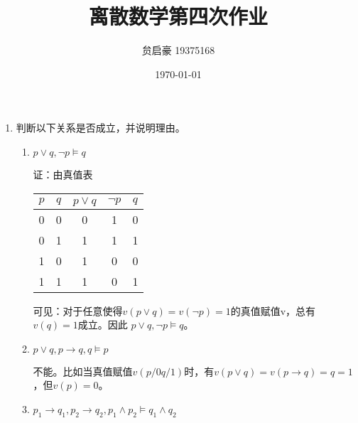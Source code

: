 \documentclass[UTF8]{ctexart}
\title{离散数学第四次作业}
\author{贠启豪 19375168}
\date{\today}
\begin{document}
   \maketitle
    \begin{enumerate}
        \item 判断以下关系是否成立，并说明理由。
        \begin{enumerate}
            \item $p \vee  q , \neg p \models  q $
            
            证：由真值表
            \begin{table}[H]
                \centering
                \begin{tabular}{|ccccc|}
                    \hline
                    $p$ & $q$ & $p\vee q$ & $\neg p$ & $q$\\
                    \hline
                    0 & 0 & 0 & 1 & 0\\ 
                    \hline 
                    0 & 1 & 1 & 1 & 1\\ 
                    \hline
                    1 & 0 & 1 & 0 & 0\\
                    \hline
                    1 & 1 & 1 & 0 & 1\\
                    \hline
                \end{tabular}
            \end{table}
            可见：对于任意使得$v(p\vee q) = v(\neg p)=1$的真值赋值v，总有$v(q)=1$成立。因此
            $p \vee  q , \neg p \models  q $。
            \item $p \vee  q , p \rightarrow q, q \models  p $
            
            不能。比如当真值赋值$v(p/0 q/1)$时，有$v(p \vee  q) = v(p \rightarrow q)= q=1$，但$v(p)=0$。

            \item $p_1 \rightarrow q_1 , p_2 \rightarrow q_2 , p_1 \wedge  p_2 \models  q_1 \wedge  q_2 $
            

\end{enumerate}
\end{enumerate}
\end{document}
